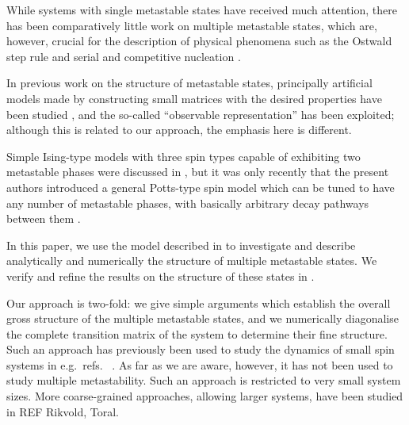 \documentclass[10pt]{article}
\begin{document}
While systems with single metastable states have received much attention, there
has been comparatively little work on multiple metastable states, which are,
however, crucial for the description of physical phenomena such as the Ostwald
step rule \cite{Ostwald1897} and serial and competitive nucleation
\cite{PoonEvansColloidPolymerTripleCoexPRL1999,
PoonEvansClassificationOrderingKinetics3PhasePRE2001}.

In previous work on the structure of metastable states, principally artificial models made by constructing small
matrices with the desired properties have been studied
\cite{GaveauLesneSchulmanSpectralSignaturesHierarchicalRelaxationPLA1999,
GaveauSchulmanMultiplePhasesPRE2006}, and 
the so-called ``observable representation''
\cite{GaveauSchulmanMultiplePhasesPRE2006,
GaveauSchulmanImagingGeomThroughDynObsRepnJPA2006,
SchulmanMeanFieldSpinGlassObsRepnPRL2007} has been exploited; although this is
related to our approach, the emphasis here is different.  


Simple Ising-type models with three spin types capable of exhibiting two 
metastable phases were discussed in
\cite{RikvoldNovotnyCompetingMetastablePRE1994,
CirilloOlivieriMetastableBlumeCapel1996}, but it was only recently that the
present authors introduced a general Potts-type spin model which can be tuned
to have any number of metastable phases, with basically arbitrary decay pathways
between them \cite{SandersLarraldeLeyvrazCompetitiveNucleationPottsPRB2007}.


In this paper, we use the model described in \cite{SandersLarraldeLeyvrazCompetitiveNucleationPottsPRB2007} to investigate and describe analytically and numerically the 
structure of multiple metastable states. We verify and refine the results on
the structure of these states in \cite{LarraldeLeyvrazSandersJStatMech2006}.

Our approach is two-fold: we give simple arguments which establish the
overall gross structure of the multiple metastable states, and 
 we numerically diagonalise the complete transition matrix of the
system to determine their fine structure. Such an approach has previously been
used to study the dynamics of
small spin systems in e.g.\ refs.~
\cite{NightingaleComputationDominantEigenvaluesEigenvectorsPRB1993,
NightingaleCorrelationTimesCriticalityPRB2000,
StinchcombeNucleationtimesKineticIsingPRE2005,
SchulmanMeanFieldSpinGlassObsRepnPRL2007}. As far as we are aware, however, it
has not been used to study multiple metastability.  Such an approach is
restricted to very small system sizes. More coarse-grained approaches, allowing
larger systems, have been studied in REF Rikvold, Toral.
\end{document}
